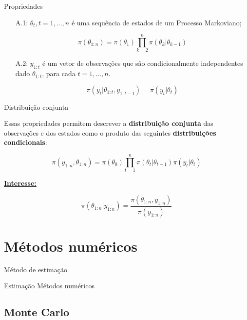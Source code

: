 \documentclass{beamer}
\begin{document}
\begin{frame}{Propriedades}
\begin{center}
\begin{itemize}
\item[A.1:] $\theta_t, t=1,...,n$ é uma sequência de estados de um Processo Markoviano;

$$
\pi(\theta_{1:n}) = \pi(\theta_1) \prod_{k=2}^n \pi(\theta_k|\theta_{k-1}) 
$$

\pause 

\item[A.2:] $y_{1:t}$ é um vetor de observações que são condicionalmente independentes dado $\theta_{1:t}$, para cada $t=1,...,n$.

$$
\pi(y_t|\theta_{1:t},y_{1:t-1}) = \pi(y_t|\theta_{t})
$$

\end{itemize}
\end{center}
\end{frame}


\begin{frame}{Distribuição conjunta}

Essas propriedades permitem descrever a \textbf{distribuição conjunta} das observações e dos estados como o produto das seguintes \textbf{distribuições condicionais}:

$$
\pi(y_{1:n},\theta_{1:n}) = \pi(\theta_0) \prod_{t=1}^n \pi(\theta_t|\theta_{t-1})\pi(y_t|\theta_t) 
$$

\underline{\textbf{Interesse:}}

$$\pi(\theta_{1:n}|y_{1:n}) =  \frac{\pi(\theta_{1:n},y_{1:n})}{\pi(y_{1:n})} $$


\end{frame}



\section{Métodos numéricos}

\begin{frame}{Método de estimação}
    \begin{block}{Estimação}
      \Huge  Métodos numéricos
    \end{block}

\end{frame}


\subsection{Monte Carlo}
\end{document}

